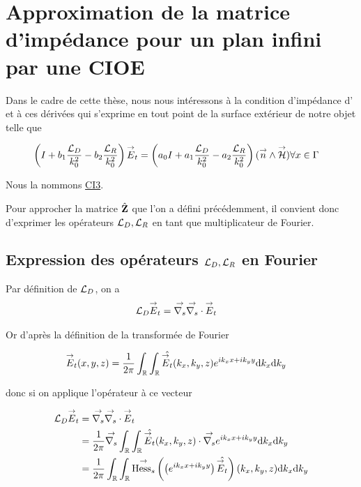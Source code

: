 \section{Approximation de la matrice d'impédance pour un plan infini par une CIOE}

    Dans le cadre de cette thèse, nous nous intéressons à la condition d'impédance d'\cite{aubakirov_electromagnetic_2014} et à ces dérivées qui s'exprime en tout point de la surface extérieur de notre objet telle que

    \begin{align}
        \left(I + b_1 \dfrac{{\mathcal{L}_D}}{k_0^2} - b_2 \dfrac{{\mathcal{L}_R}}{k_0^2} \right){\overset{\rightarrow}{E}}_t = \left(a_0 I + a_1 \dfrac{{\mathcal{L}_D}}{k_0^2} - a_2 \dfrac{{\mathcal{L}_R}}{k_0^2} \right)({\overset{\rightarrow}{n}} \wedge {\overset{\rightarrow}{\mathcal{H}}}) & \forall x \in \Gamma
    \end{align}

    Nous la nommons \hyperlink{ci3}{CI3}.

    Pour approcher la matrice \(\hat{\mathbf{Z}}\) que l'on a défini précédemment, il convient donc d'exprimer les opérateurs \({\mathcal{L}_D}, {\mathcal{L}_R}\) en tant que multiplicateur de Fourier.

  \subsection[Expression des opérateurs LD LR en Fourier]{Expression des opérateurs \({\mathcal{L}_D},{\mathcal{L}_R}\) en Fourier}
    \label{sec:plan:hoibc:LD-LR}

    Par définition de \({\mathcal{L}_D}\), on a
    \begin{align}
      {\mathcal{L}_D} {\overset{\rightarrow}{E}}_t & = {\overset{\rightarrow}{\nabla_s}}{} {\overset{\rightarrow}{\nabla_s}} \cdot{} {\overset{\rightarrow}{E}}_t
    \end{align}

    Or d’après la définition de la transformée de Fourier

    \begin{align}
      {\overset{\rightarrow}{E}}_t(x,y,z) & = \dfrac{1}{2\pi}\int_\mathbb R\int_\mathbb R \hat{{\overset{\rightarrow}{E}}_t}(k_x,k_y,z)e^{ik_xx + ik_yy}\mathrm{d}{k_x}\mathrm{d}{k_y}
    \end{align}

    donc si on applique l'opérateur à ce vecteur

    \begin{align}
      {\mathcal{L}_D} {\overset{\rightarrow}{E}}_t
      & = {\overset{\rightarrow}{\nabla_s}}{} {\overset{\rightarrow}{\nabla_s}} \cdot{} {\overset{\rightarrow}{E}}_t
      \\
      &=\dfrac{1}{2\pi}{\overset{\rightarrow}{\nabla_s}}{} \int_\mathbb R\int_\mathbb R \hat{{\overset{\rightarrow}{E}}_t}(k_x,k_y,z) \cdot {\overset{\rightarrow}{\nabla_s}}{} e^{ik_xx + ik_yy}\mathrm{d}{k_x}\mathrm{d}{k_y}
      \\
      &=\dfrac{1}{2\pi}\int_\mathbb R \int_\mathbb R {\overset{\rightarrow}{\operatorname{Hess}_s}}{}\left(\left( e^{ik_xx + ik_yy} \right) \hat{{\overset{\rightarrow}{E}}_t}\right)(k_x,k_y,z)\mathrm{d}{k_x}\mathrm{d}{k_y}
    \end{align}

